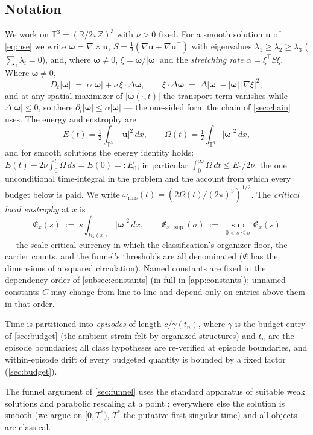 \documentclass[11pt,letterpaper]{amsart}
\theoremstyle{definition}
\theoremstyle{remark}
\newcommand{\TT}{\mathbb{T}}
\newcommand{\RR}{\mathbb{R}}
\newcommand{\om}{\omega}
\newcommand{\vort}{\boldsymbol{\omega}}
\newcommand{\uu}{\boldsymbol{u}}
\newcommand{\abs}[1]{\lvert #1 \rvert}
\begin{document}
\subsection{Notation}\label{subsec:notation}
We work on $\TT^3=(\RR/2\pi\mathbb{Z})^3$ with $\nu>0$ fixed. For a smooth solution
$\uu$ of \eqref{eq:nse} we write $\vort=\nabla\times\uu$,
$S=\tfrac12(\nabla\uu+\nabla\uu^{\top})$ with eigenvalues
$\lambda_1\ge\lambda_2\ge\lambda_3$ ($\sum_i\lambda_i=0$), and, where $\vort\neq0$,
$\xi=\vort/\abs{\vort}$ and the \emph{stretching rate}
$\alpha=\xi^{\top}S\xi$. Where $\vort\neq0$,
\[
D_t\abs{\vort}\;=\;\alpha\abs{\vort}+\nu\,\xi\!\cdot\!\Delta\vort,
\qquad
\xi\!\cdot\!\Delta\vort\;=\;\Delta\abs{\vort}-\abs{\vort}\,\abs{\nabla\xi}^{2},
\]
and at any spatial maximizer of $\abs{\vort(\cdot,t)}$ the transport term vanishes
while $\Delta\abs{\vort}\le0$, so there $\partial_t\abs{\vort}\le\alpha\abs{\vort}$ ---
the one-sided form the chain of \cref{sec:chain} uses. The energy and
enstrophy are
\[
E(t)=\tfrac12\int_{\TT^3}\abs{\uu}^2\,dx,\qquad
\Omega(t)=\tfrac12\int_{\TT^3}\abs{\vort}^2\,dx,
\]
and for smooth solutions the energy identity holds:
$E(t)+2\nu\int_0^t\Omega\,ds=E(0)=:E_0$; in particular
$\int_0^\infty\Omega\,dt\le E_0/2\nu$, the one unconditional time-integral in the
problem and the account from which every budget below is paid. We write
$\om_{\mathrm{rms}}(t)=(2\Omega(t)/(2\pi)^3)^{1/2}$. The \emph{critical
local enstrophy} at $x$ is
\[
\mathfrak{E}_x(s)\;:=\;s\!\int_{B_s(x)}\abs{\vort}^2\,dx,
\qquad
\mathfrak{E}_{x,\sup}(\sigma)\;:=\;\sup_{0<s\le\sigma}\mathfrak{E}_x(s)
\]
--- the scale-critical currency in which the classification's organizer
floor, the carrier counts, and the funnel's thresholds are all denominated
($\mathfrak{E}$ has the dimensions of a squared circulation). Named constants are fixed in the
dependency order of \cref{subsec:constants} (in full in \cref{app:constants});
unnamed constants $C$ may change from line to line and depend only on entries above
them in that order.

Time is partitioned into \emph{episodes} of length $c/\gamma(t_n)$, where $\gamma$ is
the budget entry of \cref{sec:budget} (the ambient strain felt by organized
structures) and $t_n$ are the episode boundaries; all class hypotheses are re-verified
at episode boundaries, and within-episode drift of every budgeted quantity is bounded
by a fixed factor (\cref{sec:budget}).

The funnel argument of \cref{sec:funnel} uses the standard apparatus of suitable weak
solutions and parabolic rescaling at a point
\cite{CKN1982,Lin1998,LemarieRieusset2002,KikuchiSeregin2007}; everywhere else the
solution is smooth (we argue on $[0,T^*)$, $T^*$ the putative first singular time) and
all objects are classical.
\end{document}
